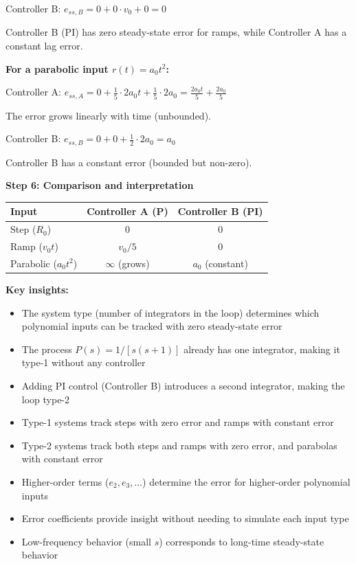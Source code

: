 \documentclass[11pt,a4paper]{article}
\begin{document}
Controller B: $e_{ss,B} = 0 + 0 \cdot v_0 + 0 = 0$

Controller B (PI) has zero steady-state error for ramps, while Controller A has a constant lag error.

\textbf{For a parabolic input $r(t) = a_0 t^2$:}

Controller A: $e_{ss,A} = 0 + \frac{1}{5} \cdot 2a_0 t + \frac{1}{5} \cdot 2a_0 = \frac{2a_0 t}{5} + \frac{2a_0}{5}$

The error grows linearly with time (unbounded).

Controller B: $e_{ss,B} = 0 + 0 + \frac{1}{2} \cdot 2a_0 = a_0$

Controller B has a constant error (bounded but non-zero).

\textbf{Step 6: Comparison and interpretation}

\begin{center}
\begin{tabular}{|l|c|c|}
\hline
\textbf{Input} & \textbf{Controller A (P)} & \textbf{Controller B (PI)} \\
\hline
Step ($R_0$) & 0 & 0 \\
Ramp ($v_0 t$) & $v_0/5$ & 0 \\
Parabolic ($a_0 t^2$) & $\infty$ (grows) & $a_0$ (constant) \\
\hline
\end{tabular}
\end{center}

\textbf{Key insights:}
\begin{itemize}
\item The system type (number of integrators in the loop) determines which polynomial inputs can be tracked with zero steady-state error
\item The process $P(s) = 1/[s(s+1)]$ already has one integrator, making it type-1 without any controller
\item Adding PI control (Controller B) introduces a second integrator, making the loop type-2
\item Type-1 systems track steps with zero error and ramps with constant error
\item Type-2 systems track both steps and ramps with zero error, and parabolas with constant error
\item Higher-order terms ($e_2, e_3, \ldots$) determine the error for higher-order polynomial inputs
\item Error coefficients provide insight without needing to simulate each input type
\item Low-frequency behavior (small $s$) corresponds to long-time steady-state behavior
\end{itemize}
\end{document}
